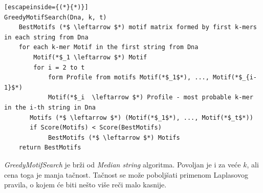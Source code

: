 \begin{lstlisting}[escapeinside={(*}{*)}]
GreedyMotifSearch(Dna, k, t)
	BestMotifs (*$ \leftarrow $*) motif matrix formed by first k-mers in each string from Dna
	for each k-mer Motif in the first string from Dna
	    Motif(*$_1 \leftarrow $*) Motif
	    for i = 2 to t
	        form Profile from motifs Motif(*$_1$*), ..., Motif(*$_{i-1}$*)
	        Motif(*$_i  \leftarrow $*) Profile - most probable k-mer in the i-th string in Dna
	   Motifs (*$ \leftarrow $*) (Motif(*$_1$*), ..., Motif(*$_t$*))
	   if Score(Motifs) < Score(BestMotifs)
	        BestMotifs (*$ \leftarrow $*) Motifs
    return BestMotifs
\end{lstlisting}

\textit{GreedyMotifSearch} je brži od \textit{Median string} algoritma. Povoljan je i za veće $k$, ali cena toga je manja tačnost. Tačnost se može poboljšati primenom Laplasovog pravila, o kojem će biti nešto više reči malo kasnije.


